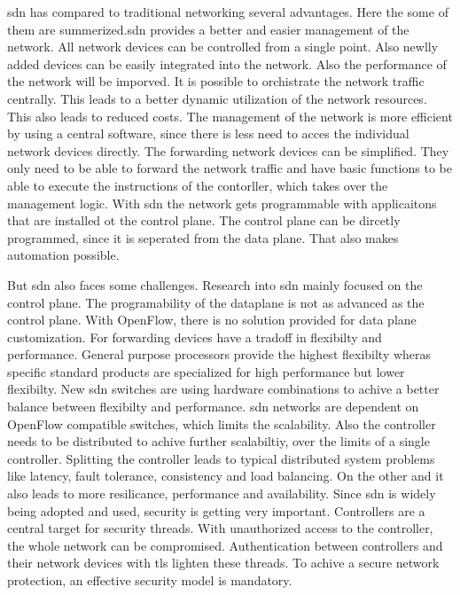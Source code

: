 \documentclass[conference]{IEEEtran}
\begin{document}
	\acf{sdn} has compared to traditional networking several advantages. Here the some of them are summerized.\ac{sdn} provides a better and easier management of the network. All network devices can be controlled from a single point. Also newlly added devices can be easily integrated into the network. \cite{Jefia2018-pj}
	Also the performance of the network will be imporved. It is possible to orchistrate the network traffic centrally. This leads to a better dynamic utilization of the network resources. This also leads to reduced costs. The management of the network is more efficient by using a central software, since there is less need to acces the individual network devices directly. \cite{Jefia2018-pj}
	The forwarding network devices can be simplified. They only need to be able to forward the network traffic and have basic functions to be able to execute the instructions of the contorller, which takes over the management logic. \cite{Hussain2022-tc} With \ac{sdn} the network gets programmable with applicaitons that are installed ot the control plane. The control plane can be dircetly programmed, since it is seperated from the data plane. That also makes automation possible. \cite{Hussain2022-tc}

	But \ac{sdn} also faces some challenges. Research into \ac{sdn} mainly focused on the control plane. The programability of the dataplane is not as advanced as the control plane. With OpenFlow, there is no solution provided for data plane customization. \cite{MASOUDI20161}
	For forwarding devices have a tradoff in flexibilty and performance. General purpose processors provide the highest flexibilty wheras specific standard products are specialized for high performance but lower flexibilty. \cite{Jefia2018-pj}New \ac{sdn} switches are using hardware combinations to achive a better balance between flexibilty and performance.  \cite{MASOUDI20161}
	\ac{sdn} networks are dependent on OpenFlow compatible switches, which limits the scalability. Also the controller needs to be distributed to achive further scalabiltiy, over the limits of a single controller. Splitting the controller leads to typical distributed system problems like latency, fault tolerance, consistency and load balancing. On the other and it also leads to more resilicance, performance and availability. \cite{MASOUDI20161} 
	Since \ac{sdn} is widely being adopted and used, security is getting very important. Controllers are a central target for security threads. With unauthorized access to the controller, the whole network can be compromised. Authentication between controllers and their network devices with \ac{tls} lighten these threads. To achive a secure network protection, an effective security model is mandatory. \cite{Jefia2018-pj}
\end{document}
